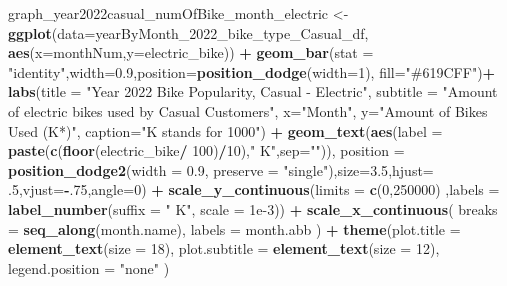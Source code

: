 \documentclass[
]{article}
\newenvironment{Shaded}{\begin{snugshade}}{\end{snugshade}}
\newcommand{\AttributeTok}[1]{\textcolor[rgb]{0.13,0.29,0.53}{#1}}
\newcommand{\DecValTok}[1]{\textcolor[rgb]{0.00,0.00,0.81}{#1}}
\newcommand{\FloatTok}[1]{\textcolor[rgb]{0.00,0.00,0.81}{#1}}
\newcommand{\FunctionTok}[1]{\textcolor[rgb]{0.13,0.29,0.53}{\textbf{#1}}}
\newcommand{\NormalTok}[1]{#1}
\newcommand{\OtherTok}[1]{\textcolor[rgb]{0.56,0.35,0.01}{#1}}
\newcommand{\SpecialCharTok}[1]{\textcolor[rgb]{0.81,0.36,0.00}{\textbf{#1}}}
\newcommand{\StringTok}[1]{\textcolor[rgb]{0.31,0.60,0.02}{#1}}
\begin{document}
\begin{Shaded}
\begin{Highlighting}[]
\NormalTok{graph\_year2022casual\_numOfBike\_month\_electric }\OtherTok{\textless{}{-}} \FunctionTok{ggplot}\NormalTok{(}\AttributeTok{data=}\NormalTok{yearByMonth\_2022\_bike\_type\_Casual\_df, }\FunctionTok{aes}\NormalTok{(}\AttributeTok{x=}\NormalTok{monthNum,}\AttributeTok{y=}\NormalTok{electric\_bike)) }\SpecialCharTok{+}
  \FunctionTok{geom\_bar}\NormalTok{(}\AttributeTok{stat =} \StringTok{"identity"}\NormalTok{,}\AttributeTok{width=}\FloatTok{0.9}\NormalTok{,}\AttributeTok{position=}\FunctionTok{position\_dodge}\NormalTok{(}\AttributeTok{width=}\DecValTok{1}\NormalTok{), }\AttributeTok{fill=}\StringTok{"\#619CFF"}\NormalTok{)}\SpecialCharTok{+}
  \FunctionTok{labs}\NormalTok{(}\AttributeTok{title =} \StringTok{"Year 2022 Bike Popularity, Casual {-} Electric"}\NormalTok{,}
       \AttributeTok{subtitle =} \StringTok{"Amount of electric bikes used by Casual Customers"}\NormalTok{,}
       \AttributeTok{x=}\StringTok{"Month"}\NormalTok{,}
       \AttributeTok{y=}\StringTok{"Amount of Bikes Used (K*)"}\NormalTok{,}
       \AttributeTok{caption=}\StringTok{"K stands for 1000"}\NormalTok{) }\SpecialCharTok{+}
  \FunctionTok{geom\_text}\NormalTok{(}\FunctionTok{aes}\NormalTok{(}\AttributeTok{label =} \FunctionTok{paste}\NormalTok{(}\FunctionTok{c}\NormalTok{(}\FunctionTok{floor}\NormalTok{(electric\_bike}\SpecialCharTok{/} \DecValTok{100}\NormalTok{)}\SpecialCharTok{/}\DecValTok{10}\NormalTok{),}\StringTok{" K"}\NormalTok{,}\AttributeTok{sep=}\StringTok{""}\NormalTok{)),}
            \AttributeTok{position =} \FunctionTok{position\_dodge2}\NormalTok{(}\AttributeTok{width =} \FloatTok{0.9}\NormalTok{, }\AttributeTok{preserve =} \StringTok{"single"}\NormalTok{),}\AttributeTok{size=}\FloatTok{3.5}\NormalTok{,}\AttributeTok{hjust=}\NormalTok{ .}\DecValTok{5}\NormalTok{,}\AttributeTok{vjust=}\SpecialCharTok{{-}}\NormalTok{.}\DecValTok{75}\NormalTok{,}\AttributeTok{angle=}\DecValTok{0}\NormalTok{) }\SpecialCharTok{+}
  \FunctionTok{scale\_y\_continuous}\NormalTok{(}\AttributeTok{limits =} \FunctionTok{c}\NormalTok{(}\DecValTok{0}\NormalTok{,}\DecValTok{250000}\NormalTok{) ,}\AttributeTok{labels =} \FunctionTok{label\_number}\NormalTok{(}\AttributeTok{suffix =} \StringTok{" K"}\NormalTok{, }\AttributeTok{scale =} \FloatTok{1e{-}3}\NormalTok{)) }\SpecialCharTok{+}
  \FunctionTok{scale\_x\_continuous}\NormalTok{(}
    \AttributeTok{breaks =} \FunctionTok{seq\_along}\NormalTok{(month.name), }
    \AttributeTok{labels =}\NormalTok{ month.abb}
\NormalTok{  ) }\SpecialCharTok{+}
  \FunctionTok{theme}\NormalTok{(}\AttributeTok{plot.title =} \FunctionTok{element\_text}\NormalTok{(}\AttributeTok{size =} \DecValTok{18}\NormalTok{),}
        \AttributeTok{plot.subtitle =} \FunctionTok{element\_text}\NormalTok{(}\AttributeTok{size =} \DecValTok{12}\NormalTok{),}
        \AttributeTok{legend.position =} \StringTok{"none"}
\NormalTok{  ) }
\end{Highlighting}
\end{Shaded}
\end{document}
